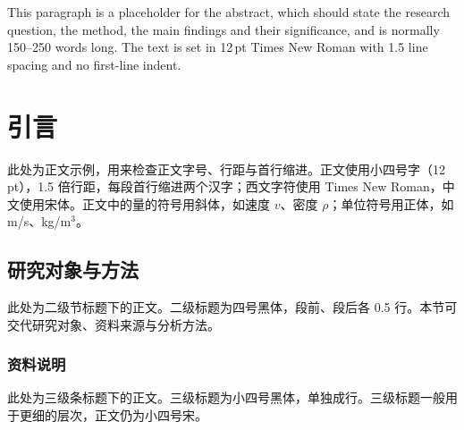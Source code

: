 \documentclass[
  zihao     = -4,          %
  linespread = 1.625,      %
  twoside,                 %
  fontset   = mac          %
]{ctexart}
\newcommand{\papertitlezh}{}
\begin{document}
\begingroup
\leftskip=0.35cm \rightskip=0.35cm

\vspace*{1.0cm}
\hfill{\linespread{1.2}\selectfont \papertitlezh}\hspace*{\fill}\par

\vspace{2.2cm}
\par
\noindent This paragraph is a placeholder for the abstract, which should state the research question, the method, the main findings and their significance, and is normally 150--250 words long. The text is set in 12\,pt Times New Roman with 1.5 line spacing and no first-line indent.\par

\vspace{2\baselineskip}
\par
\endgroup

\clearpage
{}

\section{引言}

此处为正文示例，用来检查正文字号、行距与首行缩进。正文使用小四号字（12\,pt），1.5 倍行距，每段首行缩进两个汉字；西文字符使用 Times New Roman，中文使用宋体。正文中的量的符号用斜体，如速度 $v$、密度 $\rho$；单位符号用正体，如 m/s、kg/m$^3$。

\subsection{研究对象与方法}

此处为二级节标题下的正文。二级标题为四号黑体，段前、段后各 0.5 行。本节可交代研究对象、资料来源与分析方法。

\subsubsection{资料说明}

此处为三级条标题下的正文。三级标题为小四号黑体，单独成行。三级标题一般用于更细的层次，正文仍为小四号宋。
\end{document}
